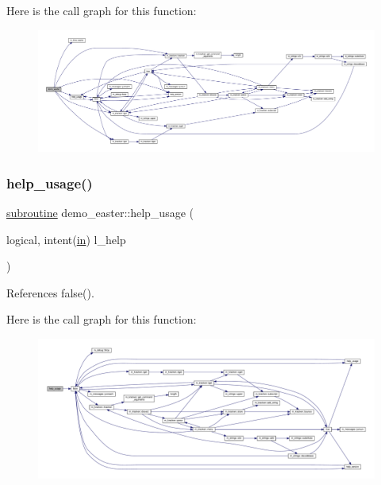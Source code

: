 Here is the call graph for this function\+:
\nopagebreak
\begin{figure}[H]
\begin{center}
\leavevmode
\includegraphics[width=350pt]{easter_8f90_a88204fbb77f8ba73861da3733036d7f0_cgraph}
\end{center}
\end{figure}
\mbox{\label{easter_8f90_ab07ad49e68ac3d3df8e071fd42bbf84e}} 
\subsubsection{\texorpdfstring{help\+\_\+usage()}{help\_usage()}}
{\footnotesize\ttfamily \hyperlink{M__stopwatch_83_8txt_acfbcff50169d691ff02d4a123ed70482}{subroutine} demo\+\_\+easter\+::help\+\_\+usage (\begin{DoxyParamCaption}\item[{logical, intent(\hyperlink{M__journal_83_8txt_afce72651d1eed785a2132bee863b2f38}{in})}]{l\+\_\+help }\end{DoxyParamCaption})}



References false().

Here is the call graph for this function\+:
\nopagebreak
\begin{figure}[H]
\begin{center}
\leavevmode
\includegraphics[width=350pt]{easter_8f90_ab07ad49e68ac3d3df8e071fd42bbf84e_cgraph}
\end{center}
\end{figure}
\mbox{\label{easter_8f90_af4f863a9a969771c1766c7a11ae2ac43}} 
